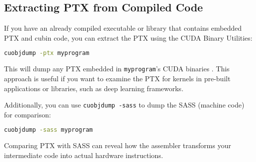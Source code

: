 \subsection{Extracting PTX from Compiled Code}

If you have an already compiled executable or library that contains embedded PTX and cubin code, you can extract the PTX using the CUDA Binary Utilities:

\begin{lstlisting}[language=bash]
cuobjdump -ptx myprogram
\end{lstlisting}

This will dump any PTX embedded in \texttt{myprogram}'s CUDA binaries \citep{nvidia_cuda_binary}. This approach is useful if you want to examine the PTX for kernels in pre-built applications or libraries, such as deep learning frameworks.

Additionally, you can use \texttt{cuobjdump -sass} to dump the SASS (machine code) for comparison:

\begin{lstlisting}[language=bash]
cuobjdump -sass myprogram
\end{lstlisting}

Comparing PTX with SASS can reveal how the assembler transforms your intermediate code into actual hardware instructions.

